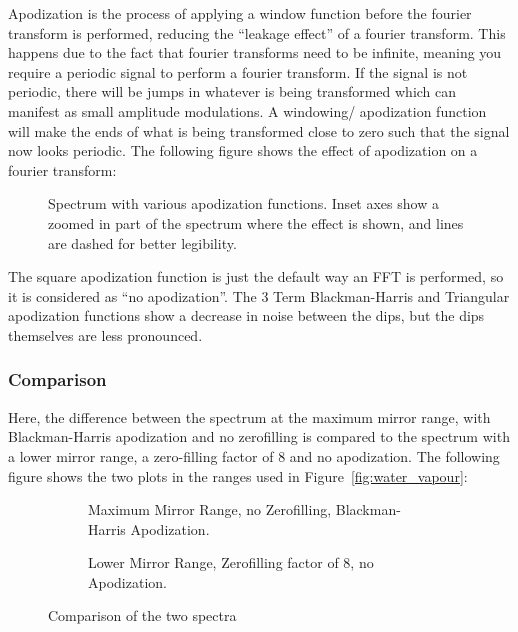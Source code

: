 \documentclass{article}
\begin{document}
Apodization is the process of applying a window function before the fourier transform is performed, reducing the ``leakage effect'' of a fourier transform. This happens due to the fact that fourier transforms need to be infinite, meaning you require a periodic signal to perform a fourier transform. If the signal is not periodic, there will be jumps in whatever is being transformed which can manifest as small amplitude modulations. A windowing/ apodization function will make the ends of what is being transformed close to zero such that the signal now looks periodic. The following figure shows the effect of apodization on a fourier transform:

\begin{figure}[h!]
	\centering
	\scalebox{0.75}{}
	\caption{Spectrum with various apodization functions. Inset axes show a zoomed in part of the spectrum where the effect is shown, and lines are dashed for better legibility.}
	\label{fig:apodization}
\end{figure}

The square apodization function is just the default way an FFT is performed, so it is considered as ``no apodization''. The 3 Term Blackman-Harris and Triangular apodization functions show a decrease in noise between the dips, but the dips themselves are less pronounced. 



\subsubsection{Comparison}

Here, the difference between the spectrum at the maximum mirror range, with Blackman-Harris apodization and no zerofilling is compared to the spectrum with a lower mirror range, a zero-filling factor of 8 and no apodization. The following figure shows the two plots in the ranges used in Figure~\ref{fig:water_vapour}:

\begin{figure}[h!]
	\centering
	\begin{subfigure}[t]{0.48\textwidth}
		\centering
		\scalebox{0.5}{}
		\caption{Maximum Mirror Range, no Zerofilling, Blackman-Harris Apodization.}
		\label{fig:air32000Comparison}
	\end{subfigure} \hfill
	\begin{subfigure}[t]{0.48\textwidth}
		\centering
		\scalebox{0.5}{}
		\caption{Lower Mirror Range, Zerofilling factor of 8, no Apodization.}
		\label{fig:air8000Comparison}
	\end{subfigure}
	\caption{Comparison of the two spectra}
	\label{fig:comparison}
\end{figure}
\end{document}
